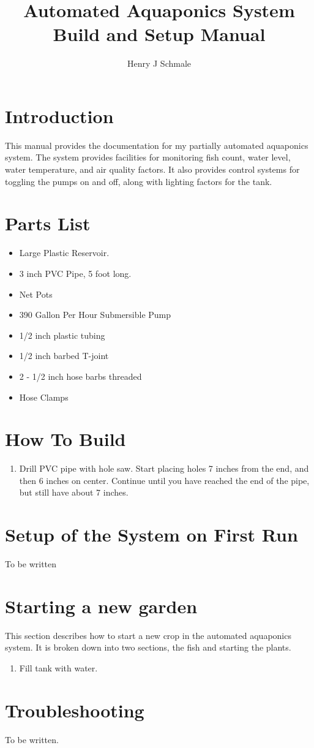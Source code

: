 \documentclass[american,man,12pt]{apa6}
\title{Automated Aquaponics System Build and Setup Manual}
\author{Henry J Schmale}
\affiliation{Harrisburg University of Science and Technology}
\begin{document}
\maketitle
\tableofcontents

\section{Introduction}
This manual provides the documentation for my partially automated aquaponics
system. The system provides facilities for monitoring fish count, water level,
water temperature, and air quality factors. It also provides control systems
for toggling the pumps on and off, along with lighting factors for the tank.

\section{Parts List}
\begin{itemize}
	\item Large Plastic Reservoir.
	\item 3 inch PVC Pipe, 5 foot long.
	\item Net Pots
	\item 390 Gallon Per Hour Submersible Pump
	\item 1/2 inch plastic tubing
    \item 1/2 inch barbed T-joint
    \item 2 - 1/2 inch hose barbs threaded
    \item Hose Clamps
\end{itemize}


\section{How To Build}
\begin{enumerate}
	\item Drill PVC pipe with hole saw. Start placing holes 7 inches from the
		  end, and then 6 inches on center. Continue until you have reached
		  the end of the pipe, but still have about 7 inches.
\end{enumerate}


\section{Setup of the System on First Run}
To be written


\section{Starting a new garden}
This section describes how to start a new crop in the automated aquaponics
system. It is broken down into two sections, the fish and starting the plants.

\begin{enumerate}
	\item Fill tank with water.
\end{enumerate}



\section{Troubleshooting}
To be written.


\printbibliography
\end{document}
